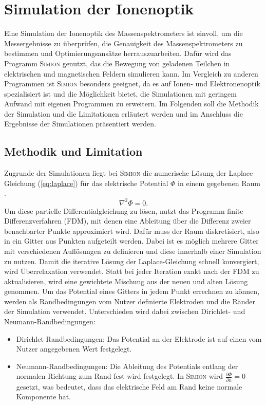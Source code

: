 \chapter{Simulation der Ionenoptik}
\label{chap:Simulation}
Eine Simulation der Ionenoptik des Massenspektrometers ist sinvoll, um die Messergebnisse zu überprüfen, die Genauigkeit des Massenspektrometers zu bestimmen und Optimierungsansätze herrauszuarbeiten. Dafür wird das Programm \textsc{Simion} genutzt, das die Bewegung von geladenen Teilchen in elektrischen und magnetischen Feldern simulieren kann. Im Vergleich zu anderen Programmen ist \textsc{Simion} besonders geeignet, da es auf Ionen- und Elektronenoptik spezialisiert ist und die Möglichkeit bietet, die Simulationen mit geringem Aufwand mit eigenen Programmen zu erweitern. Im Folgenden soll die Methodik der Simulation und die Limitationen erläutert werden und im Anschluss die Ergebnisse der Simulationen präsentiert werden.

\section{Methodik und Limitation}
Zugrunde der Simulationen liegt bei \textsc{Simion} die numerische Lösung der Laplace-Gleichung (\ref{eq:laplace}) für das elektrische Potential $\Phi$ in einem gegebenen Raum \cite{SIMION}.
\begin{equation}
    \label{eq:laplace}
    \nabla^2 \Phi = 0.
\end{equation}
Um diese partielle Differentialgleichung zu lösen, nutzt das Programm finite Differenzverfahren (FDM), mit denen eine Ableitung über die Differenz zweier benachbarter Punkte approximiert wird. Dafür muss der Raum diskretisiert, also in ein Gitter aus Punkten aufgeteilt werden. Dabei ist es möglich mehrere Gitter mit verschiedenen Auflösungen zu definieren und diese innerhalb einer Simulation zu nutzen. Damit die iterative Lösung der Laplace-Gleichung schnell konvergiert, wird Überrelaxation verwendet. Statt bei jeder Iteration exakt nach der FDM zu aktualisieren, wird eine gewichtete Mischung aus der neuen und alten Lösung genommen. Um das Potential eines Gitters in jedem Punkt errechnen zu können, werden als Randbedingungen vom Nutzer definierte Elektroden und die Ränder der Simulation verwendet. Unterschieden wird dabei zwischen Dirichlet- und Neumann-Randbedingungen:
\begin{itemize}
    \item {Dirichlet-Randbedingungen:} Das Potential an der Elektrode ist auf einen vom Nutzer angegebenen Wert festgelegt.
    \item {Neumann-Randbedingungen:} Die Ableitung des Potentials entlang der normalen Richtung zum Rand fest wird festgelegt. In \textsc{Simion} wird $\frac{\partial \Phi}{\partial n} = 0$ gesetzt, was bedeutet, dass das elektrische Feld am Rand keine normale Komponente hat.
\end{itemize}

